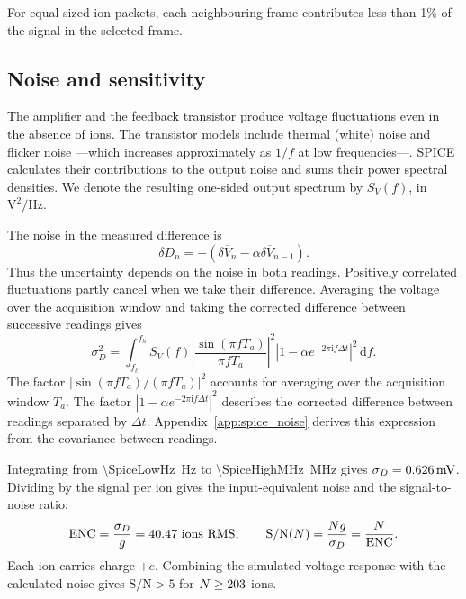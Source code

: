 \documentclass[11pt,a4paper]{article}
\newcommand{\dd}{\mathrm{d}}
\begin{document}
For equal-sized ion packets, each neighbouring frame contributes less than
1\% of the signal in the selected frame.

\subsection{Noise and sensitivity}
\label{sec:charge_noise}

The amplifier and the feedback transistor produce voltage fluctuations even
in the absence of ions. The transistor models include thermal (white) noise and flicker
noise ---which increases approximately as $1/f$ at low frequencies---. SPICE
calculates their contributions to the output noise and sums their power
spectral densities. We denote the resulting one-sided output spectrum by
$S_V(f)$, in $\mathrm{V^2/Hz}$.

The noise in the measured difference is
\begin{equation}
 \delta D_n=-\left(\delta\overline V_n-\alpha\delta\overline V_{n-1}\right).
 \label{eq:spice_noise_difference}
\end{equation}
Thus the uncertainty depends on the noise in both readings. Positively
correlated fluctuations partly cancel when we take their difference.
Averaging the voltage over the acquisition window and taking the corrected
difference between successive readings gives
%
\begin{equation}
 \sigma_D^2=\int_{f_\ell}^{f_h} S_V(f)
 \left|\frac{\sin(\pi fT_a)}{\pi fT_a}\right|^2
 \left|1-\alpha e^{-2\pi\mathrm{i}f\Delta t}\right|^2\,\dd f.
 \label{eq:spice_noise_integral}
\end{equation}
%
The factor $\left|\sin(\pi fT_a)/(\pi fT_a)\right|^2$ accounts for averaging
over the acquisition window $T_a$. The factor
$\left|1-\alpha e^{-2\pi\mathrm{i}f\Delta t}\right|^2$ describes the
corrected difference between readings separated by $\Delta t$.
Appendix~\ref{app:spice_noise} derives
this expression from the covariance between readings.

Integrating from \SI{\SpiceLowHz}{Hz} to \SI{\SpiceHighMHz}{MHz} gives
$\sigma_D=\SI{0.626}{mV}$. Dividing by the signal per ion gives
the input-equivalent noise and the signal-to-noise ratio:
\begin{equation}
 \mathrm{ENC}=\frac{\sigma_D}{g}=\SpiceEncIons\ \text{ions RMS},
 \qquad \mathrm{S/N}(N)=\frac{Ng}{\sigma_D}=\frac{N}{\mathrm{ENC}}.
 \label{eq:spice_sensitivity}
\end{equation}
Each ion carries charge $+e$. Combining the simulated voltage response with
the calculated noise gives $\mathrm{S/N}>5$ for $N\geq203$ ions.
\end{document}
